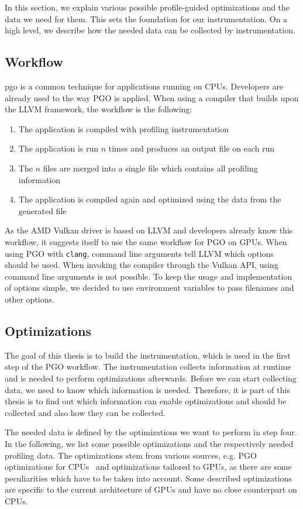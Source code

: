 \clearpage
{}
In this section, we explain various possible profile-guided optimizations and the data we need for them.
This sets the foundation for our instrumentation. On a high level, we describe how the needed data can be collected by instrumentation.

\subsection{Workflow}
\label{sub:workflow}
\Gls{pgo} is a common technique for applications running on CPUs.
Developers are already used to the way PGO is applied.
When using a compiler that builds upon the LLVM framework, the workflow is the following:
\begin{enumerate}
	\item The application is compiled with profiling instrumentation
	\item The application is run $n$ times and produces an output file on each run
	\item The $n$ files are merged into a single file which contains all profiling information
	\item The application is compiled again and optimized using the data from the generated file
\end{enumerate}
As the AMD Vulkan driver is based on LLVM and developers already know this workflow, it suggests itself to use the same workflow for PGO on GPUs.
When using PGO with \texttt{clang}, command line arguments tell LLVM which options should be used. When invoking the compiler through the Vulkan API, using command line arguments is not possible.
To keep the usage and implementation of options simple, we decided to use environment variables to pass filenames and other options.

\subsection{Optimizations}
\label{sub:optimizations}
The goal of this thesis is to build the instrumentation, which is used in the first step of the PGO workflow. The instrumentation collects information at runtime and is needed to perform optimizations afterwards. Before we can start collecting data, we need to know which information is needed. Therefore, it is part of this thesis is to find out which information can enable optimizations and should be collected and also how they can be collected.

The needed data is defined by the optimizations we want to perform in step four. In the following, we list some possible optimizations and the respectively needed profiling data.
The optimizations stem from various sources, e.g. PGO optimizations for CPUs~\cite{MicrosoftPgo} and optimizations tailored to GPUs, as there are some peculiarities which have to be taken into account.
Some described optimizations are specific to the current architecture of GPUs and have no close counterpart on CPUs.

